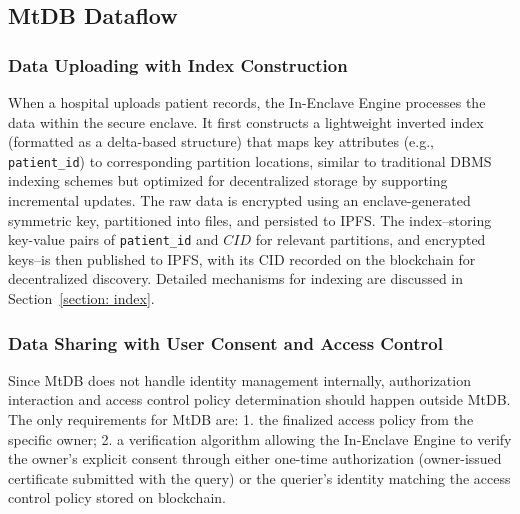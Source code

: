 \documentclass[conference]{IEEEtran}
\newcommand{\wenyi}[1]{ {\color{blue}{#1}}}
\newcommand{\ours}{\xspace MtDB\xspace}
\begin{document}

\subsection{\ours Dataflow } \label{sec:dataflow}
\subsubsection{Data Uploading with Index Construction}

When a hospital uploads patient records, the In-Enclave Engine processes the data within the secure enclave.
It first constructs a lightweight inverted index (formatted as a delta-based structure) that maps key attributes (e.g., \texttt{patient\_id}) to corresponding partition locations, similar to traditional DBMS indexing schemes but optimized for decentralized storage by supporting incremental updates. The raw data is encrypted using an enclave-generated symmetric key, partitioned into files, and persisted to IPFS. The index--storing key-value pairs of \texttt{patient\_id} and $ CID$ for relevant partitions, and encrypted keys--is then published to IPFS, with its CID recorded on the blockchain for decentralized discovery. Detailed mechanisms for indexing are discussed in Section~\ref{section: index}.



\subsubsection{Data Sharing with User Consent and Access Control}
Since \ours does not handle identity management internally, authorization interaction and access control policy determination should happen outside \ours. The only requirements for \ours are: 1. the finalized access policy from the specific owner; 2. a verification algorithm allowing the In-Enclave Engine to verify the owner's explicit consent through either one-time authorization (owner-issued certificate submitted with the query) or the querier's identity matching the access control policy stored on blockchain.
\end{document}
